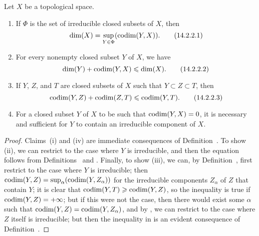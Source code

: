\begin{prop}[14.2.2]
\label{0.14.2.2}
Let $X$ be a topological space.
\begin{enumerate}[label=\emph{(\roman*)}]
    \item If $\Phi$ is the set of irreducible closed subsets of $X$, then
        \begin{equation*}
        \label{0.14.2.2.1}
            {\mathop{\mathrm{dim}}\nolimits}(X) = \sup_{Y\in\Phi}({\mathop{\mathrm{codim}}\nolimits}(Y,X)).\tag{14.2.2.1}
        \end{equation*}
    \item For every nonempty closed subset $Y$ of $X$, we have
        \begin{equation*}
        \label{0.14.2.2.2}
            {\mathop{\mathrm{dim}}\nolimits}(Y)+{\mathop{\mathrm{codim}}\nolimits}(Y,X) \leqslant {\mathop{\mathrm{dim}}\nolimits}(X).\tag{14.2.2.2}
        \end{equation*}
    \item If $Y$, $Z$, and $T$ are closed subsets of $X$ such that $Y\subset Z\subset T$, then
        \begin{equation*}
        \label{0.14.2.2.3}
            {\mathop{\mathrm{codim}}\nolimits}(Y,Z)+{\mathop{\mathrm{codim}}\nolimits}(Z,T) \leqslant {\mathop{\mathrm{codim}}\nolimits}(Y,T).\tag{14.2.2.3}
        \end{equation*}
    \item For a closed subset $Y$ of $X$ to be such that ${\mathop{\mathrm{codim}}\nolimits}(Y,X)=0$, it is necessary and sufficient for $Y$ to contain an irreducible component of $X$.
\end{enumerate}
\end{prop}

\begin{proof}
\label{proof-0.14.2.2}
Claims~(i) and (iv) are immediate consequences of Definition~.
To show (ii), we can restrict to the case where $Y$ is irreducible, and then the equation follows from Definitions~ and .
Finally, to show (iii), we can, by Definition~, first restrict to the case where $Y$ is irreducible;
then ${\mathop{\mathrm{codim}}\nolimits}(Y,Z)=\sup_\alpha({\mathop{\mathrm{codim}}\nolimits}(Y,Z_\alpha))$ for the irreducible components $Z_\alpha$ of $Z$ that contain $Y$;
it is clear that ${\mathop{\mathrm{codim}}\nolimits}(Y,T)\geqslant{\mathop{\mathrm{codim}}\nolimits}(Y,Z)$, so the inequality is true if ${\mathop{\mathrm{codim}}\nolimits}(Y,Z)=+\infty$;
but if this were not the case, then there would exist some $\alpha$ such that ${\mathop{\mathrm{codim}}\nolimits}(Y,Z)={\mathop{\mathrm{codim}}\nolimits}(Y,Z_\alpha)$, and by , we can restrict to the case where $Z$ itself is irreducible;
but then the inequality in  is an evident consequence of Definition~.
\end{proof}

